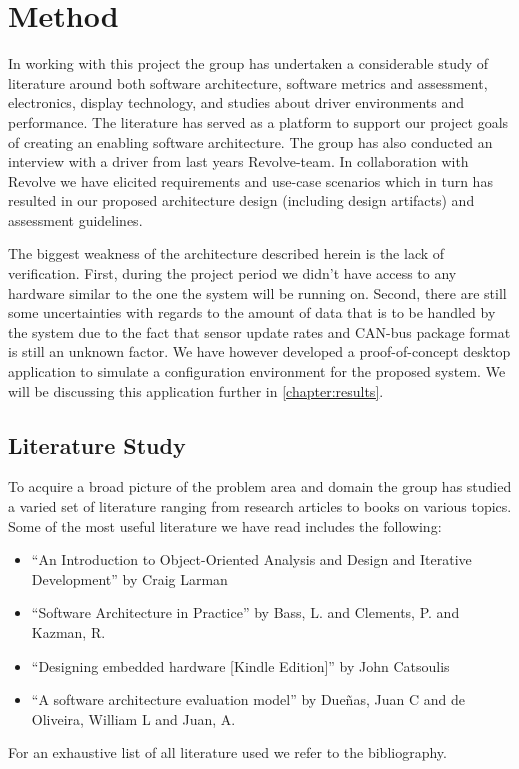 \chapter{Method}
\label{chapter:method}

In working with this project the group has undertaken a considerable study of
literature around both software architecture, software metrics and assessment, electronics, display technology,
and studies about driver environments and performance. The literature has
served as a platform to support our project goals of creating an enabling
software architecture. The group has also conducted an interview with a driver
from last years Revolve-team. In collaboration with Revolve we have elicited
requirements and use-case scenarios which in turn has resulted in our proposed
architecture design (including design artifacts) and assessment guidelines.

The biggest weakness of the architecture described herein is the lack of
verification. First, during the project period we didn't have access to any hardware
similar to the one the system will be running on. Second, there are still some
uncertainties with regards to the amount of data that is to be handled by the
system due to the fact that sensor update rates and CAN-bus package format is
still an unknown factor. We have however developed a proof-of-concept desktop
application to simulate a configuration environment for the proposed system.
We will be discussing this application further in \vref{chapter:results}. 

\section{Literature Study}
To acquire a broad picture of the problem area and domain the group has studied
a varied set of literature ranging from research articles to books on various topics. Some of the most useful literature we have read includes the following:
\begin{itemize}
	\item ``An Introduction to Object-Oriented Analysis and Design and Iterative Development'' by Craig Larman \cite{Larman:UML}
	\item ``Software Architecture in Practice'' by Bass, L. and Clements, P. and Kazman, R.
	 \cite{bass2012software}
	\item ``Designing embedded hardware [Kindle Edition]'' by John Catsoulis
	\item ``A software architecture evaluation model'' by Dueñas, Juan C and de Oliveira, William L and Juan, A.
	\cite{duenas1998software}
\end{itemize} 
For an exhaustive list of all literature used we refer to the
bibliography.


